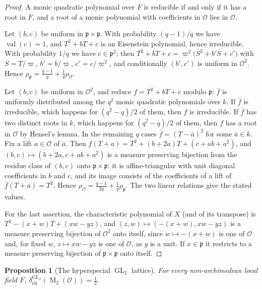 \documentclass[11pt,reqno]{amsart}
\numberwithin{equation}{section}
\theoremstyle{plain}
\newtheorem{proposition}[theorem]{Proposition}
\theoremstyle{definition}
\theoremstyle{remark}
\theoremstyle{plain}
\newcommand{\OO}{\mathcal{O}}    %
\newcommand{\pp}{\mathfrak{p}}   %
\newcommand{\elld}[2][]{\delta_{\mathrm{ell}}^{#1}(#2)}  %
\DeclareMathOperator{\val}{val}
\DeclareMathOperator{\GL}{GL}
\DeclareMathOperator{\Mat}{M}
\begin{document}
\begin{proof}
A monic quadratic polynomial over $F$ is reducible if and only if it has
a root in $F$, and a root of a monic polynomial with coefficients in $\OO$
lies in $\OO$.

Let $(b,c)$ be uniform in $\pp\times\pp$. With probability $(q-1)/q$ we
have $\val(c)=1$, and $T^2+bT+c$ is an Eisenstein polynomial, hence
irreducible. With probability $1/q$ we have $c\in\pp^2$; then
$T^2+bT+c=\varpi^2\bigl(S^2+b'S+c'\bigr)$ with $S=T/\varpi$, $b'=b/\varpi$,
$c'=c/\varpi^2$, and conditionally $(b',c')$ is uniform in $\OO^2$. Hence
$\rho_{\pp}=\frac{q-1}q+\frac1q\rho_{\OO}$.

Let $(b,c)$ be uniform in $\OO^2$, and reduce $f=T^2+bT+c$ modulo $\pp$:
$\bar f$ is uniformly distributed among the $q^2$ monic quadratic polynomials
over $k$. If $\bar f$ is irreducible, which happens for $(q^2-q)/2$ of them,
then $f$ is irreducible. If $\bar f$ has two distinct roots in $k$, which
happens for $(q^2-q)/2$ of them, then $f$ has a root in $\OO$ by Hensel's
lemma. In the remaining $q$ cases $\bar f=(T-\bar a)^2$ for some
$\bar a\in k$. Fix a lift $a\in\OO$ of $\bar a$. Then
$f(T+a)=T^2+(b+2a)T+(c+ab+a^2)$, and $(b,c)\mapsto(b+2a,c+ab+a^2)$ is a
measure preserving bijection from the residue class of $(b,c)$ onto
$\pp\times\pp$: it is affine-triangular with unit diagonal coefficients
in $b$ and $c$, and its image consists of the coefficients of a lift of
$\bar f(T+\bar a)=T^2$. Hence
$\rho_{\OO}=\frac{q-1}{2q}+\frac1q\rho_{\pp}$. The two linear relations
give the stated values.

For the last assertion, the characteristic polynomial of $X$ (and of its
transpose) is $T^2-(x+w)T+(xw-yz)$, and
$(z,w)\mapsto(-(x+w),xw-yz)$ is a measure preserving bijection of $\OO^2$
onto itself, since $w\mapsto-(x+w)$ is one of $\OO$ and, for fixed $w$,
$z\mapsto xw-yz$ is one of $\OO$, as $y$ is a unit. If $x\in\pp$ it
restricts to a measure preserving bijection of $\pp\times\pp$ onto itself.
\end{proof}

\begin{proposition}[The hyperspecial $\GL_2$ lattice]\label{prop:gl2}
For every non-archimedean local field $F$, $\elld[\GL_2]{\Mat_2(\OO)}=\frac12$.
\end{proposition}
\end{document}
